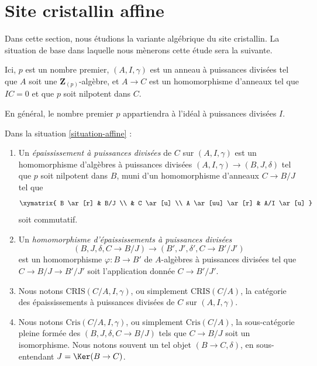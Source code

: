\section{Site cristallin affine}
\label{section-affine-site}

\noindent
Dans cette section, nous étudions la variante algébrique du site cristallin.
La situation de base dans laquelle nous mènerons cette étude sera la
suivante.

\begin{situation}
\label{situation-affine}
Ici, $p$ est un nombre premier, $(A, I, \gamma)$ est un anneau à puissances
divisées tel que $A$ soit une $\mathbf{Z}_{(p)}$-algèbre, et $A \to C$ est un
homomorphisme d'anneaux tel que $IC = 0$ et que $p$ soit nilpotent dans $C$.
\end{situation}

\noindent
En général, le nombre premier $p$ appartiendra à l'idéal
à puissances divisées $I$.

\begin{definition}
\label{definition-affine-thickening}
Dans la situation \ref{situation-affine} :
\begin{enumerate}
\item Un {\it épaississement à puissances divisées} de $C$ sur $(A, I, \gamma)$
est un homomorphisme d'algèbres à puissances divisées $(A, I, \gamma) \to (B, J, \delta)$
tel que $p$ soit nilpotent dans $B$, muni d'un homomorphisme d'anneaux $C \to B/J$ tel que
$$
\xymatrix{
B \ar[r] & B/J \\
& C \ar[u] \\
A \ar[uu] \ar[r] & A/I \ar[u]
}
$$
soit commutatif.
\item Un {\it homomorphisme d'épaississements à puissances divisées}
$$
(B, J, \delta, C \to B/J) \longrightarrow (B', J', \delta', C \to B'/J')
$$
est un homomorphisme $\varphi : B \to B'$ de $A$-algèbres à puissances divisées tel
que $C \to B/J \to B'/J'$ soit l'application donnée $C \to B'/J'$.
\item Nous notons $\text{CRIS}(C/A, I, \gamma)$, ou simplement $\text{CRIS}(C/A)$,
la catégorie des épaississements à puissances divisées de $C$ sur $(A, I, \gamma)$.
\item Nous notons $\text{Cris}(C/A, I, \gamma)$, ou simplement $\text{Cris}(C/A)$,
la sous-catégorie pleine formée des $(B, J, \delta, C \to B/J)$ tels que
$C \to B/J$ soit un isomorphisme. Nous notons souvent un tel objet
$(B \to C, \delta)$, en sous-entendant $J = \Ker(B \to C)$.
\end{enumerate}
\end{definition}

